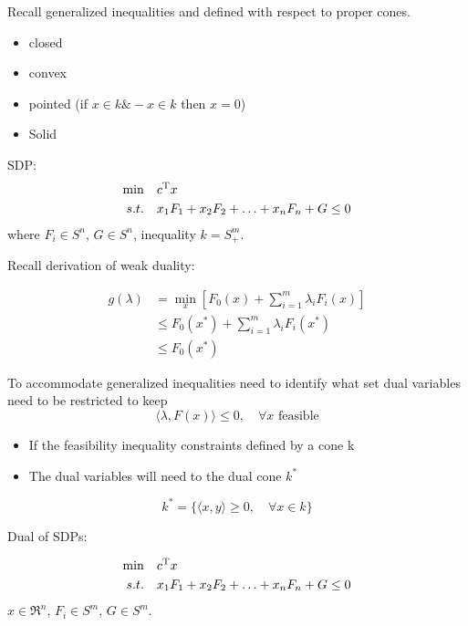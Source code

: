 Recall generalized inequalities and defined with respect to proper cones.

\begin{itemize}
	\item closed
	
	\item convex
	
	\item pointed (if $x\in k \& -x\in k$ then $x=0$)
	
	\item Solid
\end{itemize}

SDP:
\begin{align*}
\min\quad &c^{{\rm T}}x\\
s.t.\quad &x_1F_1+x_2F_2+\ldots+x_nF_n+G\leq 0
\end{align*}
where $F_i\in S^n$, $G\in S^n$, inequality $k=S^m_+$.


Recall derivation of weak duality:

\begin{align*}
g(\lambda) &= \min_x[F_0(x) + \sum^m_{i=1}\lambda_iF_i(x)]\\
&\leq F_0(x^*) + \sum^m_{i=1}\lambda_i F_i(x^*) \\
&\leq F_0(x^*)
\end{align*}

To accommodate generalized inequalities need to identify what set dual variables need to be restricted to keep
\begin{equation*}
\langle \lambda, F(x)\rangle\leq 0,\quad \forall x \text{ feasible}
\end{equation*}



\begin{itemize}
	\item If the feasibility inequality constraints defined by a cone k
	
	\item The dual variables will need to the dual cone $k^*$
\end{itemize}

\begin{equation*}
k^*=\{\langle x,y\rangle \geq 0, \quad \forall x\in k \}
\end{equation*}

Dual of SDPs:

\begin{align*}
\min\quad &c^{{\rm T}}x\\
s.t.\quad &x_1F_1+x_2F_2+\ldots+x_nF_n+G\leq 0
\end{align*}
$x\in \Re^n$, $F_i\in S^m$, $G\in S^m$.


